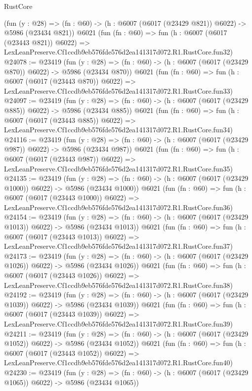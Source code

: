 \begin{lexlean}{RustCore}
\begin{coremodule}
    (fun (y : @28) => (fn : @60) -> (h : @6007 (@6017 (@23429 @821)) @6022) -> @5986 (@23434 @821))
    @6021
    (fun (fn : @60) =>
    fun (h : @6007 (@6017 (@23443 @821)) @6022) =>
    LexLeanPreserve.Cf1ccdb9eb576fde576d2ea141317d072.R1.RustCore.fun32)
@24078 := @23419
    (fun (y : @28) => (fn : @60) -> (h : @6007 (@6017 (@23429 @870)) @6022) -> @5986 (@23434 @870))
    @6021
    (fun (fn : @60) =>
    fun (h : @6007 (@6017 (@23443 @870)) @6022) =>
    LexLeanPreserve.Cf1ccdb9eb576fde576d2ea141317d072.R1.RustCore.fun33)
@24097 := @23419
    (fun (y : @28) => (fn : @60) -> (h : @6007 (@6017 (@23429 @885)) @6022) -> @5986 (@23434 @885))
    @6021
    (fun (fn : @60) =>
    fun (h : @6007 (@6017 (@23443 @885)) @6022) =>
    LexLeanPreserve.Cf1ccdb9eb576fde576d2ea141317d072.R1.RustCore.fun34)
@24116 := @23419
    (fun (y : @28) => (fn : @60) -> (h : @6007 (@6017 (@23429 @987)) @6022) -> @5986 (@23434 @987))
    @6021
    (fun (fn : @60) =>
    fun (h : @6007 (@6017 (@23443 @987)) @6022) =>
    LexLeanPreserve.Cf1ccdb9eb576fde576d2ea141317d072.R1.RustCore.fun35)
@24135 := @23419
    (fun (y : @28) =>
    (fn : @60) -> (h : @6007 (@6017 (@23429 @1000)) @6022) -> @5986 (@23434 @1000))
    @6021
    (fun (fn : @60) =>
    fun (h : @6007 (@6017 (@23443 @1000)) @6022) =>
    LexLeanPreserve.Cf1ccdb9eb576fde576d2ea141317d072.R1.RustCore.fun36)
@24154 := @23419
    (fun (y : @28) =>
    (fn : @60) -> (h : @6007 (@6017 (@23429 @1013)) @6022) -> @5986 (@23434 @1013))
    @6021
    (fun (fn : @60) =>
    fun (h : @6007 (@6017 (@23443 @1013)) @6022) =>
    LexLeanPreserve.Cf1ccdb9eb576fde576d2ea141317d072.R1.RustCore.fun37)
@24173 := @23419
    (fun (y : @28) =>
    (fn : @60) -> (h : @6007 (@6017 (@23429 @1026)) @6022) -> @5986 (@23434 @1026))
    @6021
    (fun (fn : @60) =>
    fun (h : @6007 (@6017 (@23443 @1026)) @6022) =>
    LexLeanPreserve.Cf1ccdb9eb576fde576d2ea141317d072.R1.RustCore.fun38)
@24192 := @23419
    (fun (y : @28) =>
    (fn : @60) -> (h : @6007 (@6017 (@23429 @1039)) @6022) -> @5986 (@23434 @1039))
    @6021
    (fun (fn : @60) =>
    fun (h : @6007 (@6017 (@23443 @1039)) @6022) =>
    LexLeanPreserve.Cf1ccdb9eb576fde576d2ea141317d072.R1.RustCore.fun39)
@24211 := @23419
    (fun (y : @28) =>
    (fn : @60) -> (h : @6007 (@6017 (@23429 @1052)) @6022) -> @5986 (@23434 @1052))
    @6021
    (fun (fn : @60) =>
    fun (h : @6007 (@6017 (@23443 @1052)) @6022) =>
    LexLeanPreserve.Cf1ccdb9eb576fde576d2ea141317d072.R1.RustCore.fun40)
@24230 := @23419
    (fun (y : @28) =>
    (fn : @60) -> (h : @6007 (@6017 (@23429 @1065)) @6022) -> @5986 (@23434 @1065))

\end{coremodule}
\end{lexlean}
